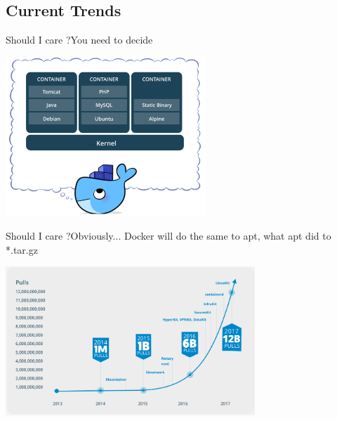 \documentclass{beamer}
\begin{document}
\subsection{Current Trends}
\begin{frame}{Should I care ?}{You need to decide}
\begin{center}
    \includegraphics[height=6cm]{docker2.png}
\end{center}
\end{frame}

\begin{frame}{Should I care ?}{Obviously...}
\alert{Docker} will do the same to \alert{apt}, what \alert{apt} did to \alert{*.tar.gz}
	\begin{center}
        \includegraphics[height=5.6cm]{interest.png}
    \end{center}
\end{frame}
\end{document}
